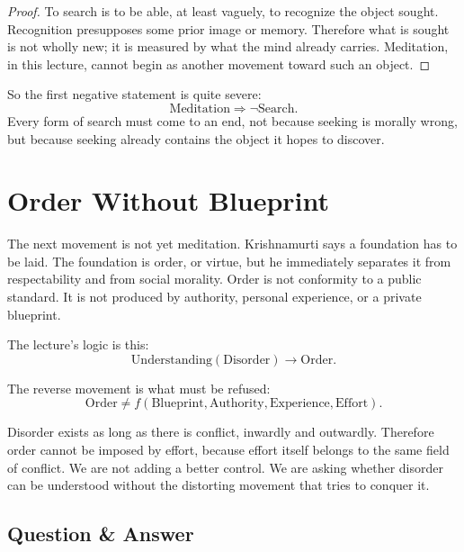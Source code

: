 \begin{proof}
To search is to be able, at least vaguely, to recognize the object sought. Recognition presupposes some prior image or memory. Therefore what is sought is not wholly new; it is measured by what the mind already carries. Meditation, in this lecture, cannot begin as another movement toward such an object.
\end{proof}

So the first negative statement is quite severe:
\begin{equation}
\mathrm{Meditation} \Rightarrow \neg \mathrm{Search}.
\end{equation}
Every form of search must come to an end, not because seeking is morally wrong, but because seeking already contains the object it hopes to discover.

\section{Order Without Blueprint}

The next movement is not yet meditation. Krishnamurti says a foundation has to be laid. The foundation is order, or virtue, but he immediately separates it from respectability and from social morality. Order is not conformity to a public standard. It is not produced by authority, personal experience, or a private blueprint.

The lecture's logic is this:
\begin{equation}
\mathrm{Understanding}(\mathrm{Disorder}) \longrightarrow \mathrm{Order}.
\end{equation}

The reverse movement is what must be refused:
\begin{equation}
\mathrm{Order} \neq
f(\mathrm{Blueprint},\mathrm{Authority},\mathrm{Experience},\mathrm{Effort}).
\end{equation}

Disorder exists as long as there is conflict, inwardly and outwardly. Therefore order cannot be imposed by effort, because effort itself belongs to the same field of conflict. We are not adding a better control. We are asking whether disorder can be understood without the distorting movement that tries to conquer it.

\subsection{Question \& Answer}

